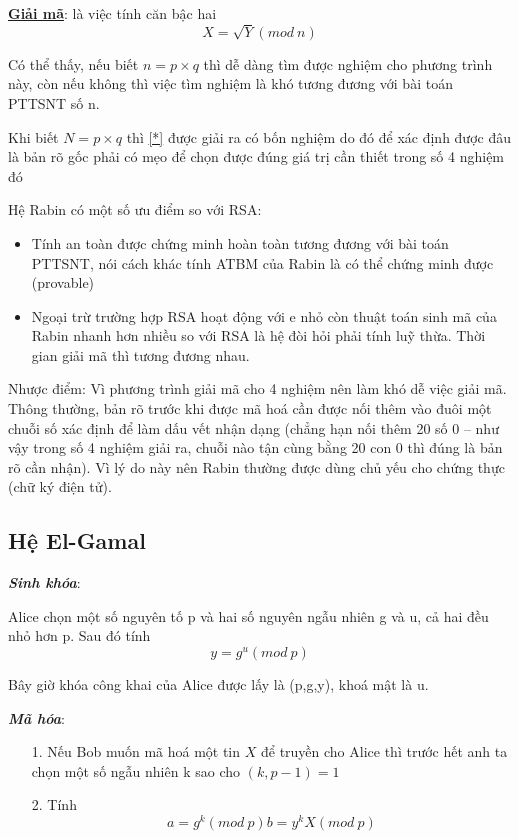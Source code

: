 \documentclass[a4paper,12pt]{report}
\begin{document}
\textbf{\underline{Giải mã}}: là việc tính căn bậc hai
\begin{equation}
X = \sqrt{Y} (mod \ n)  \label{*} 
\end{equation}

Có thể thấy, nếu biết $n=p\times q$ thì dễ dàng tìm được nghiệm cho phương trình này, còn nếu không thì việc tìm nghiệm là khó tương đương với bài toán PTTSNT số n.

Khi biết $N=p\times q$ thì \ref{*} được giải ra có bốn nghiệm do đó để xác định được đâu là bản rõ gốc phải có mẹo để chọn được đúng giá trị cần thiết trong số 4 nghiệm đó

Hệ Rabin có một số ưu điểm so với RSA:
\begin{itemize}
\item Tính an toàn được chứng minh hoàn toàn tương đương với bài toán PTTSNT, nói cách khác tính ATBM của Rabin là có thể chứng minh  được (provable)
\item Ngoại trừ trường hợp RSA hoạt động với e nhỏ còn thuật toán sinh mã của Rabin nhanh hơn nhiều so với RSA là hệ đòi hỏi phải tính luỹ thừa. Thời gian giải mã thì
tương đương nhau.
\end{itemize}

Nhược điểm: Vì phương trình giải mã cho 4 nghiệm nên làm khó dễ việc giải mã. Thông thường, bản rõ trước khi được mã hoá cần được nối thêm vào đuôi một chuỗi số xác định để làm dấu vết nhận dạng (chẳng hạn nối thêm 20 số 0 – như vậy trong số 4 nghiệm giải ra, chuỗi nào tận cùng bằng 20 con 0 thì đúng là bản rõ cần nhận). Vì lý do này nên Rabin thường được dùng chủ yếu cho chứng thực (chữ ký điện tử).
\subsection*{Hệ El-Gamal}
\textbf{\textit{Sinh khóa}}:

Alice chọn một số nguyên tố p và hai số nguyên ngẫu nhiên g và u, cả hai đều nhỏ hơn p. Sau đó tính 
\begin{displaymath}
y = g^u (mod \ p)
\end{displaymath}

Bây giờ khóa công khai của Alice được lấy là (p,g,y), khoá mật là u.

\textbf{\textit{Mã hóa}}:
\begin{itemize}
\item[1. ] Nếu Bob muốn mã hoá một tin $X$ để truyền cho Alice thì trước hết anh ta chọn một số ngẫu nhiên k sao cho $(k,p-1) = 1$
\item[2. ] Tính 
\begin{displaymath}
a = g^k(mod \ p)
b = y^kX(mod \ p)
\end{displaymath}
\end{itemize}
\end{document}
